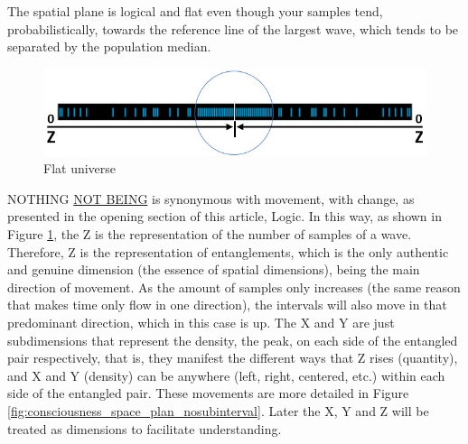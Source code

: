 The spatial plane is logical and flat even though your samples tend, probabilistically, towards the reference line of the largest wave, which tends to be separated by the population median.
	\begin{figure}[H]
	\caption{Flat universe}
	\label{fig:consciousness_flat_universe}
	\centering
	\includegraphics[scale=.6]{sections/images/consciousness_flat_universe.jpg}
	\end{figure}

NOTHING \underline{NOT BEING} is synonymous with movement, with change, as presented in the opening section of this article, Logic. In this way, as shown in Figure \ref{fig:consciousness_flat_universe}, the Z is the representation of the number of samples of a wave. Therefore, Z is the representation of entanglements, which is the only authentic and genuine dimension (the essence of spatial dimensions), being the main direction of movement. As the amount of samples only increases (the same reason that makes time only flow in one direction), the intervals will also move in that predominant direction, which in this case is up. The X and Y are just subdimensions that represent the density, the peak, on each side of the entangled pair respectively, that is, they manifest the different ways that Z rises (quantity), and X and Y (density) can be anywhere (left, right, centered, etc.) within each side of the entangled pair. These movements are more detailed in Figure \ref{fig:consciousness_space_plan_nosubinterval}. Later the X, Y and Z will be treated as dimensions to facilitate understanding.

